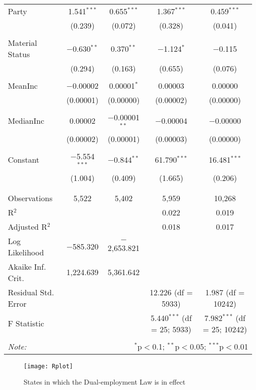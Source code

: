 \documentclass[12pt,english]{article}
\begin{document}
\begin{table}[!htbp]
\begin{tabular}{@{\extracolsep{5pt}}lcccc}
 Party & 1.541$^{***}$ & 0.655$^{***}$ & 1.367$^{***}$ & 0.459$^{***}$ \\ 
  & (0.239) & (0.072) & (0.328) & (0.041) \\ 
  & & & & \\ 
 Material Status & $-$0.630$^{**}$ & 0.370$^{**}$ & $-$1.124$^{*}$ & $-$0.115 \\ 
  & (0.294) & (0.163) & (0.655) & (0.076) \\ 
  & & & & \\ 

 MeanInc & $-$0.00002 & 0.00001$^{*}$ & 0.00003 & 0.00000 \\ 
  & (0.00001) & (0.00000) & (0.00002) & (0.00000) \\ 
  & & & & \\ 
 MedianInc & 0.00002 & $-$0.00001$^{**}$ & $-$0.00004 & $-$0.00000 \\ 
  & (0.00002) & (0.00001) & (0.00003) & (0.00000) \\ 
  & & & & \\ 


 Constant & $-$5.554$^{***}$ & $-$0.844$^{**}$ & 61.790$^{***}$ & 16.481$^{***}$ \\ 
  & (1.004) & (0.409) & (1.665) & (0.206) \\ 
  & & & & \\ 
\hline \\[-1.8ex] 
Observations & 5,522 & 5,402 & 5,959 & 10,268 \\ 
R$^{2}$ &  &  & 0.022 & 0.019 \\ 
Adjusted R$^{2}$ &  &  & 0.018 & 0.017 \\ 
Log Likelihood & $-$585.320 & $-$2,653.821 &  &  \\ 
Akaike Inf. Crit. & 1,224.639 & 5,361.642 &  &  \\ 
Residual Std. Error &  &  & 12.226 (df = 5933) & 1.987 (df = 10242) \\ 
F Statistic &  &  & 5.440$^{***}$ (df = 25; 5933) & 7.982$^{***}$ (df = 25; 10242) \\ 
\hline 
\hline \\[-1.8ex] 
\textit{Note:}  & \multicolumn{4}{r}{$^{*}$p$<$0.1; $^{**}$p$<$0.05; $^{***}$p$<$0.01} \\ 
\end{tabular} 
\end{table} 
 

\begin{figure}[H]
\centering
\label{tab:Law} 

\graphicspath{ {Rplot} }

\texttt{[image: Rplot]}
\caption{States in which the Dual-employment Law is in effect}
\end{figure}
\end{document}
